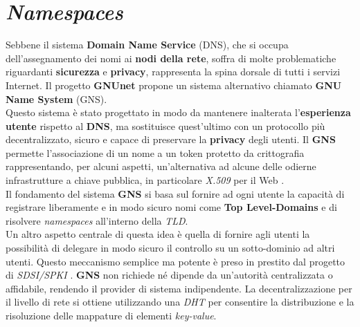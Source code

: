 \chapter{\textit{Namespaces}}
Sebbene il sistema \textbf{Domain Name Service} (DNS), che si occupa dell'assegnamento dei nomi ai \textbf{nodi della rete}, soffra di molte problematiche riguardanti \textbf{sicurezza} e \textbf{privacy}, rappresenta la spina dorsale di tutti i servizi Internet. Il progetto \textbf{GNUnet} propone un sistema alternativo chiamato \textbf{GNU Name System} (GNS).\\
Questo sistema è stato progettato in modo da mantenere inalterata l'\textbf{esperienza utente} rispetto al \textbf{DNS}, ma sostituisce quest'ultimo con un protocollo più decentralizzato, sicuro e capace di preservare la \textbf{privacy} degli utenti\cite{GNS}. Il \textbf{GNS} permette l'associazione di un nome a un token protetto da crittografia rappresentando, per alcuni aspetti, un'alternativa ad alcune delle odierne infrastrutture a chiave pubblica, in particolare \textit{X.509} per il Web \cite{L0}. \\
Il fondamento del sistema \textbf{GNS} si basa sul fornire ad ogni utente la capacità di registrare liberamente e in modo sicuro nomi come \textbf{Top Level-Domains} e di risolvere \textit{namespaces} all'interno della \textit{TLD}.\\
Un altro aspetto centrale di questa idea è quella di fornire agli utenti la possibilità di delegare in modo sicuro il controllo su un sotto-dominio ad altri utenti. Questo meccanismo semplice ma potente è preso in prestito dal progetto di \textit{SDSI/SPKI} \cite{spki}. \textbf{GNS} non richiede né dipende da un'autorità centralizzata o affidabile, rendendo il provider di sistema indipendente. La decentralizzazione per il livello di rete si ottiene utilizzando una \textit{DHT} per consentire la distribuzione e la risoluzione delle mappature di elementi \textit{key-value}.



